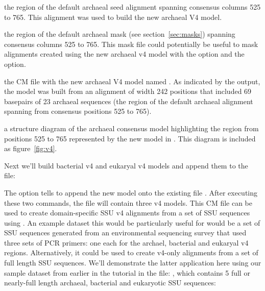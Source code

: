 \begin{sreitems}{}

\item[\prog{archaea-0p1-sb.525-765.stk}] the region of the default
  archaeal seed alignment spanning consensus columns 525 to
  765. This alignment was used to build the new archaeal V4 model.
  
\item[\prog{archaea-0p1-sb.525-765.mask}] the region of the default
  archaeal mask (see section~\ref{sec:masks}) spanning consensus
  columns 525 to 765. This mask file could potentially be useful to mask
  alignments created using the new archaeal v4 model with the
   option and the  option.
  
\item[\prog{v4.cm}] the CM file with the new archaeal V4 model named
  . As indicated by the output, the model was built
  from an alignment of width 242 positions that included 69
  basepairs of 23 archaeal sequences (the region of the default
  archaeal alignment spanning from consensus positions 525 to 765).
  
\item[\prog{archaea-0p1-sb.525-765.ps}] a structure diagram 
  of the archaeal consensus model highlighting the region from
  positions 525 to 765 represented by the new model in .
  This diagram is included as figure~\ref{fig:v4}.
\end{sreitems}

Next we'll build bacterial v4 and eukaryal v4 models and append them
to the  file:



The  option tells  to append the new model
onto the existing file .
After executing these two commands, the  file will contain
three v4 models. This CM file can be used to create domain-specific
SSU v4 alignments from a set of SSU sequences using
. An example dataset this would be particularly useful
for would be a set of SSU sequences generated from an environmental
sequencing survey that used three sets of PCR primers: one each for
the archael, bacterial and eukaryal v4 regions. Alternatively, it
could be used to create v4-only alignments from a set of full length
SSU sequences. We'll demonstrate the latter application here using our
sample dataset from earlier in the tutorial in the file:
, which contains 5 full or nearly-full
length archaeal, bacterial and eukaryotic SSU sequences:

